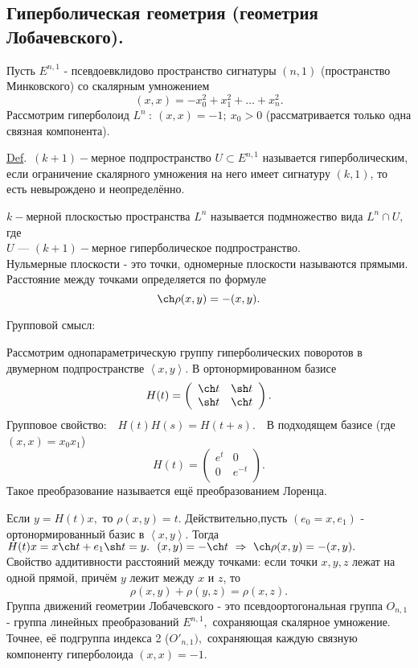 \documentclass[a4paper]{article}%
\renewcommand{\de}{\par\noindent\underline{Def}.\ }%
\renewcommand{\ab}{\par\noindent}%
\newcommand{\lob}[1]{\left\langle#1\right\rangle}%
\begin{document}
\subsection{Гиперболическая геометрия (геометрия Лобачевского).}
Пусть $E^{n,1}$ - псевдоевклидово пространство сигнатуры $(n,1)$ (пространство Минковского) со скалярным умножением
$$(x,x)=-x_0^2+x_1^2+\dots+x_n^2.$$
Рассмотрим гиперболоид $L^n\ :\ (x,x)=-1;\ x_0>0$ (рассматривается только одна связная компонента).
\de $(k+1)-$мерное подпространство $U\subset E^{n,1}$ называется гиперболическим, если ограничение скалярного умножения на
него имеет сигнатуру $(k,1)$, то есть невырождено и неопределённо.
\ab$k-$мерной плоскостью пространства $L^n$ называется подмножество вида $L^n\cap U,$ где \\
$U$ --- $(k+1)-$мерное гиперболическое подпространство.\\
Нульмерные плоскости - это точки, одномерные плоскости называются прямыми.
\\ Расстояние между точками определяется по формуле $$\ch\rho(x,y)=-(x,y).$$
\ab Групповой смысл:
\ab Рассмотрим однопараметрическую группу гиперболических поворотов в двумерном подпространстве $\lob{x,y}.$
В ортонормированном базисе
$$
H(t)=\left(%
\begin{array}{cc}
  \ch t & \sh t \\
  \sh t & \ch t \\
\end{array}%
\right).
$$
Групповое свойство:\ \ $H(t)H(s)=H(t+s).$\ \ В подходящем базисе (где $(x,x)=x_0x_1$)
$$
H(t)=\left(%
\begin{array}{cc}
  e^t & 0 \\
  0 & e^{-t} \\
\end{array}%
\right).
$$
Такое преобразование называется ещё преобразованием Лоренца.
\ab Если $y=H(t)x,$ то $\rho(x,y)=t.$ Действительно,пусть $(e_0=x,e_1)$ - ортонормированный базис в $\lob{x,y}$.
Тогда $H(t)x=x\ch t+e_1\sh t=y.\ \ (x,y)=-\ch t\ \Rightarrow\ \ch\rho(x,y)=-(x,y).$
\\Свойство аддитивности расстояний между точками: если точки $x,y,z$ лежат на одной прямой, причём $y$ лежит между
$x$ и $z$, то $$\rho(x,y)+\rho(y,z)=\rho(x,z).$$
Группа движений геометрии Лобачевского - это псевдоортогональная группа $O_{n,1}$ - группа линейных
преобразований $E^{n,1},$ сохраняющая скалярное умножение. Точнее, её подгруппа индекса 2 ($O'_{n,1}),$ сохраняющая
каждую связную компоненту гиперболоида $(x,x)=-1.$
\end{document}
